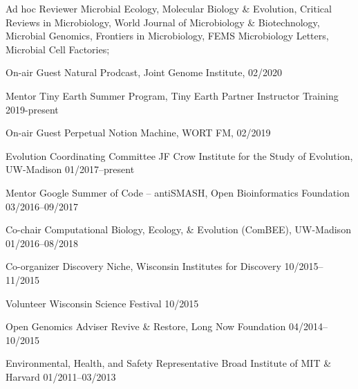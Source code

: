 

\begin{cvhonors}

\cvhonor
{Ad hoc Reviewer}
{Microbial Ecology, Molecular Biology \& Evolution, Critical Reviews in Microbiology, World Journal of Microbiology \& Biotechnology, Microbial Genomics, Frontiers in Microbiology, FEMS Microbiology Letters, Microbial Cell Factories; \textbf{\textit{}}}
{}

\cvhonor
{On-air Guest}
{Natural Prodcast, Joint Genome Institute, \textbf{\textit{}}}
{02/2020}

\cvhonor
{Mentor}
{Tiny Earth Summer Program, Tiny Earth Partner Instructor Training}
{2019-present}

\cvhonor
{On-air Guest}
{Perpetual Notion Machine, WORT FM, \textbf{\textit{}}}
{02/2019}

\cvhonor
{Evolution Coordinating Committee}
{JF Crow Institute for the Study of Evolution, UW-Madison}
{01/2017--present}

\cvhonor
{Mentor}
{Google Summer of Code -- antiSMASH, Open Bioinformatics Foundation}
{03/2016--09/2017}

\cvhonor
{Co-chair}
{Computational Biology, Ecology, \& Evolution (ComBEE), UW-Madison}
{01/2016--08/2018}

\cvhonor
{Co-organizer}
{Discovery Niche, Wisconsin Institutes for Discovery}
{10/2015--11/2015}

\cvhonor
{Volunteer}
{Wisconsin Science Festival}
{10/2015}

\cvhonor
{Open Genomics Adviser}
{Revive \& Restore, Long Now Foundation}
{04/2014--10/2015}

\cvhonor
{Environmental, Health, and Safety Representative}
{Broad Institute of MIT \& Harvard}
{01/2011--03/2013}

\end{cvhonors}
